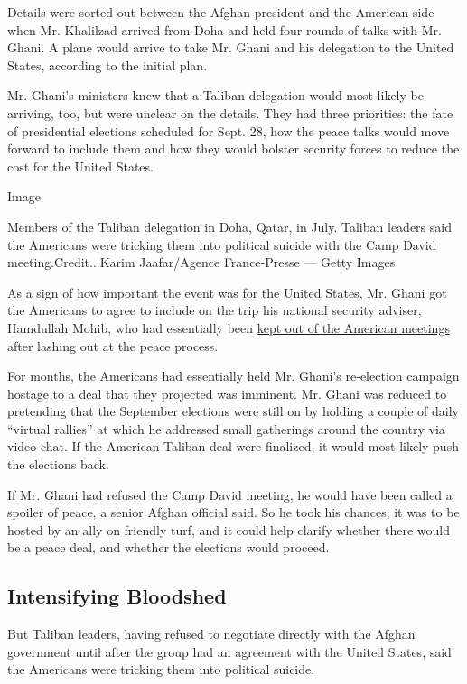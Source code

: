 Details were sorted out between the Afghan president and the American
side when Mr. Khalilzad arrived from Doha and held four rounds of talks
with Mr. Ghani. A plane would arrive to take Mr. Ghani and his
delegation to the United States, according to the initial plan.

Mr. Ghani's ministers knew that a Taliban delegation would most likely
be arriving, too, but were unclear on the details. They had three
priorities: the fate of presidential elections scheduled for Sept. 28,
how the peace talks would move forward to include them and how they
would bolster security forces to reduce the cost for the United States.

Image

Members of the Taliban delegation in Doha, Qatar, in July. Taliban
leaders said the Americans were tricking them into political suicide
with the Camp David meeting.Credit...Karim Jaafar/Agence France-Presse
--- Getty Images

As a sign of how important the event was for the United States, Mr.
Ghani got the Americans to agree to include on the trip his national
security adviser, Hamdullah Mohib, who had essentially been
\href{https://www.nytimes.com/2019/03/30/world/asia/afghanistan-hamdullah-mohib-zalmay-khalilzad.html?module=inline}{kept
out of the American meetings} after lashing out at the peace process.

For months, the Americans had essentially held Mr. Ghani's re-election
campaign hostage to a deal that they projected was imminent. Mr. Ghani
was reduced to pretending that the September elections were still on by
holding a couple of daily ``virtual rallies'' at which he addressed
small gatherings around the country via video chat. If the
American-Taliban deal were finalized, it would most likely push the
elections back.

If Mr. Ghani had refused the Camp David meeting, he would have been
called a spoiler of peace, a senior Afghan official said. So he took his
chances; it was to be hosted by an ally on friendly turf, and it could
help clarify whether there would be a peace deal, and whether the
elections would proceed.

\hypertarget{intensifying-bloodshed}{%
\subsection{Intensifying Bloodshed}\label{intensifying-bloodshed}}

But Taliban leaders, having refused to negotiate directly with the
Afghan government until after the group had an agreement with the United
States, said the Americans were tricking them into political suicide.

